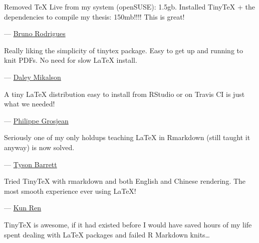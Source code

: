 \documentclass[
  xelatex,ja=standard,jafont=noto]{bxjsreport}
\renewenvironment{quote}{\def\FrameCommand{{\color{quotebarcolor}{\vrule width 3pt}}\hspace{10pt}}\MakeFramed{\advance\hsize-\width\FrameRestore}}{\endMakeFramed}
\begin{document}
\begin{quote}
Removed TeX Live from my system (openSUSE): 1.5gb. Installed TinyTeX +
the dependencies to compile my thesis: 150mb!!!! This is great!
\end{quote}

\begin{quote}
---
\href{https://twitter.com/brodriguesco/status/942162790587957248}{Bruno
Rodrigues}
\end{quote}

\begin{quote}
Really liking the simplicity of tinytex package. Easy to get up and
running to knit PDFs. No need for slow LaTeX install.
\end{quote}

\begin{quote}
---
\href{https://twitter.com/lingwhatics/status/941766989424537602}{Daley
Mikalson}
\end{quote}

\begin{quote}
A tiny LaTeX distribution easy to install from RStudio or on Travis CI
is just what we needed!
\end{quote}

\begin{quote}
---
\href{https://twitter.com/PhilGrosjean/status/941241878309232640}{Philippe
Grosjean}
\end{quote}

\begin{quote}
Seriously one of my only holdups teaching LaTeX in Rmarkdown (still
taught it anyway) is now solved.
\end{quote}

\begin{quote}
---
\href{https://twitter.com/healthandstats/status/941169151749406720}{Tyson
Barrett}
\end{quote}

\begin{quote}
Tried TinyTeX with rmarkdown and both English and Chinese rendering. The
most smooth experience ever using LaTeX!
\end{quote}

\begin{quote}
--- \href{https://twitter.com/renkun_ken/status/941352666730455041}{Kun
Ren}
\end{quote}

\begin{quote}
TinyTeX is awesome, if it had existed before I would have saved hours of
my life spent dealing with LaTeX packages and failed R Markdown
knits\ldots{}
\end{quote}
\end{document}
